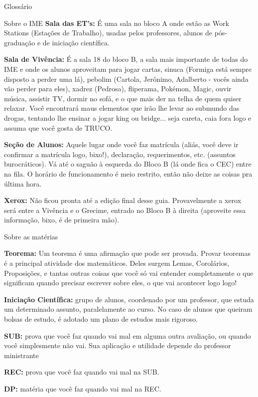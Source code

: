 \begin{secao}{Glossário}
\begin{subsecao}{Sobre o IME}
{\bf Sala das ET's:} É uma sala no bloco A onde estão as Work Stations (Estações de
Trabalho), usadas pelos professores, alunos de pós-graduação e de iniciação
científica.

{\bf Sala de Vivência:} É a sala 18 do bloco B, a sala mais importante de todas do IME e onde os alunos aproveitam para jogar cartas, sinuca (Formiga está sempre disposto a perder uma lá), pebolim (Cartola, Jerônimo, Adalberto - vocês ainda vão perder para eles), xadrez (Pedrosa), fliperama, Pokémon, Magic, ouvir música, assistir TV, dormir no sofá, e o que mais der na telha de quem quiser relaxar. Você encontrará maus elementos que irão lhe levar ao submundo das drogas, tentando lhe ensinar a jogar king ou bridge... seja careta, caia fora logo e assuma que você gosta de TRUCO. 

{\bf Seção de Alunos:} Aquele lugar onde você faz matrícula (aliás, você deve ir
confirmar a matrícula logo, bixo!), declaração, requerimentos, etc. (assuntos
burocráticos). Vá até o saguão à esquerda do Bloco B (lá onde fica o CEC) entre na fila.
O horário de funcionamento é meio restrito, então não deixe as coisas pra última hora.

{\bf Xerox:} Não ficou pronta até a edição final desse guia. Provavelmente a xerox será entre a Vivência e o Grecime, entrado no Bloco B à direita (aproveite essa informação, bixo, é de primeira mão).
 
\end{subsecao}

\begin{subsecao}{Sobre as matérias}

{\bf Teorema:} Um teorema é uma afirmação que pode ser provada. Provar teoremas é a principal atividade dos matemáticos. Deles surgem Lemas, Corolários, Proposições, e tantas outras coisas que você só vai entender completamente o que significam quando precisar escrever sobre eles, o que vai acontecer logo logo!

{\bf Iniciação Científica:} grupo de alunos, coordenado por um professor, que estuda
um determinado assunto, paralelamente ao curso. No caso de alunos que queiram bolsas
de estudo, é adotado um plano de estudos mais rigoroso.

{\bf SUB:} prova que você faz quando vai mal em alguma outra avaliação, ou quando você simplesmente não vai. Sua aplicação e utilidade depende do professor ministrante

{\bf REC:} prova que você faz quando vai mal na SUB.

{\bf DP:} matéria que você faz quando vai mal na REC.
\end{subsecao}


\end{secao}
